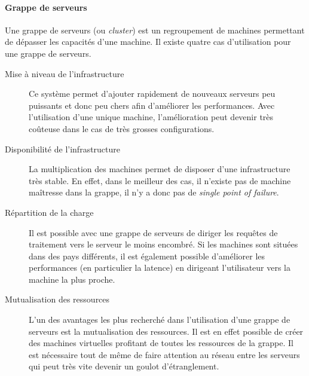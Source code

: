     \paragraph{Grappe de serveurs}
    \label{par:Grappe de serveurs}
    Une grappe de serveurs (ou \textit{cluster}) est un regroupement de machines permettant de dépasser les capacités d'une machine. Il existe quatre cas d'utilisation pour une grappe de serveurs.
    \begin{description}
      \item[Mise à niveau de l'infrastructure] Ce système permet d'ajouter rapidement de nouveaux serveurs peu puissants et donc peu chers afin d'améliorer les performances. Avec l'utilisation d'une unique machine, l'amélioration peut devenir très coûteuse dans le cas de très grosses configurations.
      \item[Disponibilité de l'infrastructure] La multiplication des machines permet de disposer d'une infrastructure très stable. En effet, dans le meilleur des cas, il n'existe pas de machine maîtresse dans la grappe, il n'y a donc pas de \textit{single point of failure}.
      \item[Répartition de la charge] Il est possible avec une grappe de serveurs de diriger les requêtes de traitement vers le serveur le moins encombré. Si les machines sont situées dans des pays différents, il est également possible d'améliorer les performances (en particulier la latence) en dirigeant l'utilisateur vers la machine la plus proche.
      \item[Mutualisation des ressources] L'un des avantages les plus recherché dans l'utilisation d'une grappe de serveurs est la mutualisation des ressources. Il est en effet possible de créer des machines virtuelles profitant de toutes les ressources de la grappe. Il est nécessaire tout de même de faire attention au réseau entre les serveurs qui peut très vite devenir un goulot d'étranglement.
    \end{description}

